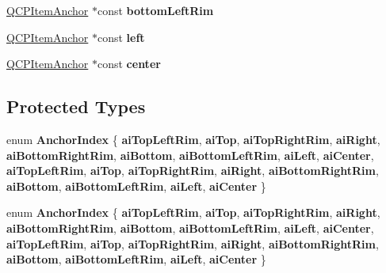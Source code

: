 \begin{DoxyCompactItemize}
\mbox{\label{class_q_c_p_item_ellipse_a2e27048c703d979f2f9fbcb146894e5b}} 
\hyperlink{class_q_c_p_item_anchor}{Q\+C\+P\+Item\+Anchor} $\ast$const {\bfseries bottom\+Left\+Rim}
\item 
\mbox{\label{class_q_c_p_item_ellipse_abda006703c0a018ae6403013ba0b3049}} 
\hyperlink{class_q_c_p_item_anchor}{Q\+C\+P\+Item\+Anchor} $\ast$const {\bfseries left}
\item 
\mbox{\label{class_q_c_p_item_ellipse_abeab6b2c874c603b4b1cd8dc452cae8d}} 
\hyperlink{class_q_c_p_item_anchor}{Q\+C\+P\+Item\+Anchor} $\ast$const {\bfseries center}
\end{DoxyCompactItemize}
\subsection*{Protected Types}
\begin{DoxyCompactItemize}
\item 
\mbox{\label{class_q_c_p_item_ellipse_a415009889543169f35b70795f415e45e}} 
enum {\bfseries Anchor\+Index} \{ \newline
{\bfseries ai\+Top\+Left\+Rim}, 
{\bfseries ai\+Top}, 
{\bfseries ai\+Top\+Right\+Rim}, 
{\bfseries ai\+Right}, 
\newline
{\bfseries ai\+Bottom\+Right\+Rim}, 
{\bfseries ai\+Bottom}, 
{\bfseries ai\+Bottom\+Left\+Rim}, 
{\bfseries ai\+Left}, 
\newline
{\bfseries ai\+Center}, 
{\bfseries ai\+Top\+Left\+Rim}, 
{\bfseries ai\+Top}, 
{\bfseries ai\+Top\+Right\+Rim}, 
\newline
{\bfseries ai\+Right}, 
{\bfseries ai\+Bottom\+Right\+Rim}, 
{\bfseries ai\+Bottom}, 
{\bfseries ai\+Bottom\+Left\+Rim}, 
\newline
{\bfseries ai\+Left}, 
{\bfseries ai\+Center}
 \}
\item 
\mbox{\label{class_q_c_p_item_ellipse_a415009889543169f35b70795f415e45e}} 
enum {\bfseries Anchor\+Index} \{ \newline
{\bfseries ai\+Top\+Left\+Rim}, 
{\bfseries ai\+Top}, 
{\bfseries ai\+Top\+Right\+Rim}, 
{\bfseries ai\+Right}, 
\newline
{\bfseries ai\+Bottom\+Right\+Rim}, 
{\bfseries ai\+Bottom}, 
{\bfseries ai\+Bottom\+Left\+Rim}, 
{\bfseries ai\+Left}, 
\newline
{\bfseries ai\+Center}, 
{\bfseries ai\+Top\+Left\+Rim}, 
{\bfseries ai\+Top}, 
{\bfseries ai\+Top\+Right\+Rim}, 
\newline
{\bfseries ai\+Right}, 
{\bfseries ai\+Bottom\+Right\+Rim}, 
{\bfseries ai\+Bottom}, 
{\bfseries ai\+Bottom\+Left\+Rim}, 
\newline
{\bfseries ai\+Left}, 
{\bfseries ai\+Center}
 \}
\end{DoxyCompactItemize}
